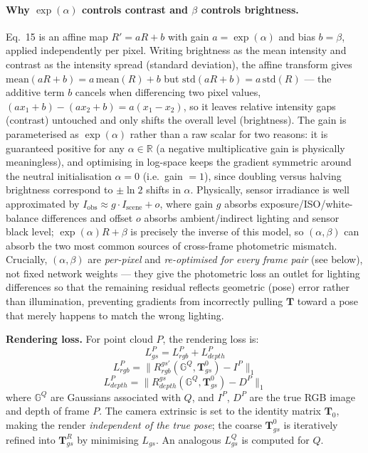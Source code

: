 \documentclass[11pt,a4paper]{article}
\begin{document}
\paragraph{Why $\exp(\alpha)$ controls contrast and $\beta$ controls brightness.} Eq.~15 is
an affine map $R'=aR+b$ with gain $a=\exp(\alpha)$ and bias $b=\beta$, applied
independently per pixel. Writing brightness as the mean intensity and contrast as the
intensity spread (standard deviation), the affine transform gives
$\mathrm{mean}(aR+b)=a\,\mathrm{mean}(R)+b$ but
$\mathrm{std}(aR+b)=a\,\mathrm{std}(R)$ — the additive term $b$ cancels when
differencing two pixel values, $(ax_1+b)-(ax_2+b)=a(x_1-x_2)$, so it leaves relative
intensity gaps (contrast) untouched and only shifts the overall level (brightness).
The gain is parameterised as $\exp(\alpha)$ rather than a raw scalar for two reasons:
it is guaranteed positive for any $\alpha\in\mathbb{R}$ (a negative multiplicative gain
is physically meaningless), and optimising in log-space keeps the gradient symmetric
around the neutral initialisation $\alpha=0$ (i.e.\ gain $=1$), since doubling versus
halving brightness correspond to $\pm\ln 2$ shifts in $\alpha$. Physically, sensor
irradiance is well approximated by $I_{\text{obs}}\approx g\cdot I_{\text{scene}}+o$,
where gain $g$ absorbs exposure/ISO/white-balance differences and offset $o$ absorbs
ambient/indirect lighting and sensor black level; $\exp(\alpha)R+\beta$ is precisely the
inverse of this model, so $(\alpha,\beta)$ can absorb the two most common sources of
cross-frame photometric mismatch. Crucially, $(\alpha,\beta)$ are \emph{per-pixel} and
\emph{re-optimised for every frame pair} (see below), not fixed network weights — they
give the photometric loss an outlet for lighting differences so that the remaining
residual reflects geometric (pose) error rather than illumination, preventing gradients
from incorrectly pulling $\mathbf{T}$ toward a pose that merely happens to match the
wrong lighting.

\textbf{Rendering loss.} For point cloud $P$, the rendering loss is:
\begin{equation}
  L^P_{gs} = L^P_{rgb} + L^P_{depth}
  \tag{17}
\end{equation}
\begin{equation}
  L^P_{rgb} = \bigl\lVert R^{gs'}_{rgb}(\mathbb{G}^Q, \mathbf{T}^0_{gs}) - I^P \bigr\rVert_1
  \tag{18}
\end{equation}
\begin{equation}
  L^P_{depth} = \bigl\lVert R^{gs}_{depth}(\mathbb{G}^Q, \mathbf{T}^0_{gs}) - D^P \bigr\rVert_1
  \tag{19}
\end{equation}
where $\mathbb{G}^Q$ are Gaussians associated with $Q$, and $I^P$, $D^P$ are the true
RGB image and depth of frame $P$. The camera extrinsic is set to the identity matrix
$\mathbf{T}_0$, making the render \emph{independent of the true pose}; the coarse
$\mathbf{T}_{gs}^0$ is iteratively refined into $\mathbf{T}_{gs}^R$ by minimising
$L_{gs}$. An analogous $L^Q_{gs}$ is computed for $Q$.
\end{document}
